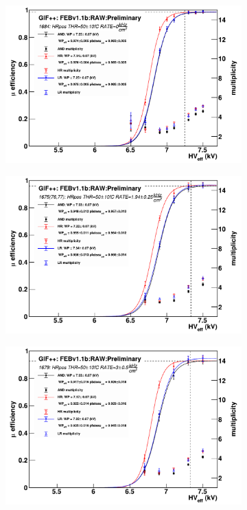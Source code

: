 \endgroup
	 
	\begin{figure}[H]
		\begin{subfigure}{.5\linewidth}
		    \centering
			\includegraphics[width = \linewidth]{fig/chapt6/iRPC-RPCROC-GIFpp-SourceOFF.pdf}
			\caption{\label{fig:RPCROCv1_Res:A}}
		\end{subfigure}
		\begin{subfigure}{.5\linewidth}
		    \centering
			\includegraphics[width = \linewidth]{fig/chapt6/iRPC-RPCROC-GIFpp-SourceON-2kHz.pdf}
			\caption{\label{fig:RPCROCv1_Res:B}}
		\end{subfigure}
		\begin{subfigure}{\linewidth}
		    \centering
			\includegraphics[width = .5\linewidth]{fig/chapt6/iRPC-RPCROC-GIFpp-SourceON-3kHz.pdf}

\end{subfigure}
\end{figure}
